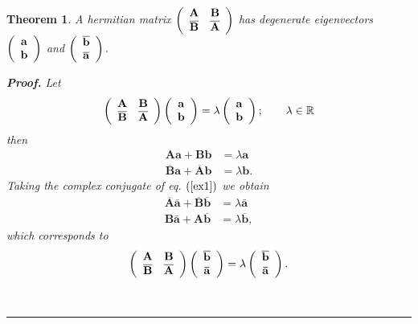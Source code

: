 \documentclass[aps,preprint]{revtex4}%
\newtheorem{theorem}{Theorem}
\newenvironment{proof}[1][Proof]{\noindent\textbf{#1.} }{\ \rule{0.5em}{0.5em}}
\begin{document}
\begin{theorem}
A hermitian matrix $\left(
\begin{array}
[c]{cc}%
\mathbf{A} & \mathbf{B}\\
\overline{\mathbf{B}} & \overline{\mathbf{A}}%
\end{array}
\right)  $ has degenerate eigenvectors $\left(
\begin{array}
[c]{c}%
\mathbf{a}\\
\mathbf{b}%
\end{array}
\right)  $ and $\left(
\begin{array}
[c]{c}%
\overline{\mathbf{b}}\\
\overline{\mathbf{a}}%
\end{array}
\right)  .$

\begin{proof}
Let
\begin{equation}
\left(
\begin{array}
[c]{cc}%
\mathbf{A} & \mathbf{B}\\
\overline{\mathbf{B}} & \overline{\mathbf{A}}%
\end{array}
\right)  \left(
\begin{array}
[c]{c}%
\mathbf{a}\\
\mathbf{b}%
\end{array}
\right)  =\lambda\left(
\begin{array}
[c]{c}%
\mathbf{a}\\
\mathbf{b}%
\end{array}
\right)  ;\qquad\lambda\in\mathbb{R}%
\end{equation}
then
\begin{align}
\mathbf{Aa+Bb}  &  =\lambda\mathbf{a}\nonumber\\
\overline{\mathbf{B}}\mathbf{a}+\overline{\mathbf{A}}\mathbf{b}  &
\mathbf{=}\lambda\mathbf{b.} \label{ex1}%
\end{align}
Taking the complex conjugate of eq. $\left(  \ref{ex1}\right)  $ we obtain
\begin{align}
\overline{\mathbf{A}}\mathbf{\bar{a}}+\overline{\mathbf{B}}\overline
{\mathbf{b}}  &  =\lambda\mathbf{\bar{a}}\nonumber\\
\mathbf{B\bar{a}}+\mathbf{A\overline{\mathbf{b}}}  &  \mathbf{=}%
\lambda\overline{\mathbf{b}},
\end{align}
which corresponds to
\begin{equation}
\left(
\begin{array}
[c]{cc}%
\mathbf{A} & \mathbf{B}\\
\overline{\mathbf{B}} & \overline{\mathbf{A}}%
\end{array}
\right)  \left(
\begin{array}
[c]{c}%
\mathbf{\overline{\mathbf{b}}}\\
\mathbf{\bar{a}}%
\end{array}
\right)  =\lambda\left(
\begin{array}
[c]{c}%
\mathbf{\overline{\mathbf{b}}}\\
\mathbf{\bar{a}}%
\end{array}
\right)  .
\end{equation}


\end{proof}
\end{theorem}
\end{document}
